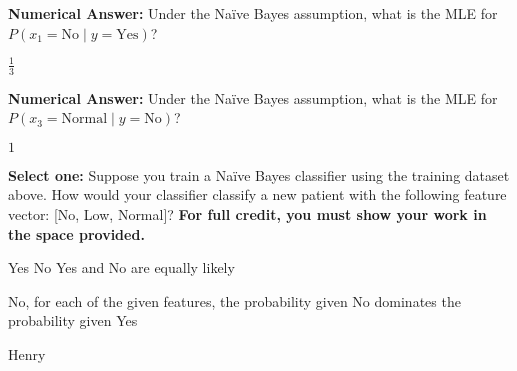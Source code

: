 \begin{parts}
\begin{subparts}
    \subpart[1] \textbf{Numerical Answer:} Under the Na\"{i}ve Bayes assumption, what is the MLE for $P(x_1=\textrm{No} \mid y=\textrm{Yes})$?
    \begin{tcolorbox}[fit,height=1.5cm, width=3cm, blank, borderline={1pt}{-2pt}]
        \begin{soln}
            $\frac{1}{3}$
        \end{soln}
    \end{tcolorbox}
        
    \subpart[1] \textbf{Numerical Answer:} Under the Na\"{i}ve Bayes assumption, what is the MLE for $P(x_3=\textrm{Normal} \mid y=\textrm{No})$?
    \begin{tcolorbox}[fit,height=1.5cm, width=3cm, blank, borderline={1pt}{-2pt}]
        \begin{soln}
            $1$
        \end{soln}
    \end{tcolorbox}

\newpage
    \subpart[2] \textbf{Select one:} Suppose you train a Na\"{i}ve Bayes classifier using the training dataset above. How would your classifier classify a new patient with the following feature vector: [No, Low, Normal]? \textbf{For full credit, you must show your work in the space provided.}
    \begin{checkboxes}
        \choice Yes
        \choice No
        \choice Yes and No are equally likely
    \end{checkboxes}
    \begin{tcolorbox}[fit,height=6cm, width=15cm, blank, borderline={1pt}{-2pt}]
        \begin{soln}
            No, for each of the given features, the probability given No dominates the probability given Yes
        \end{soln}
    \end{tcolorbox}
\end{subparts}
\begin{qauthor}
    Henry
\end{qauthor}


\end{parts}

